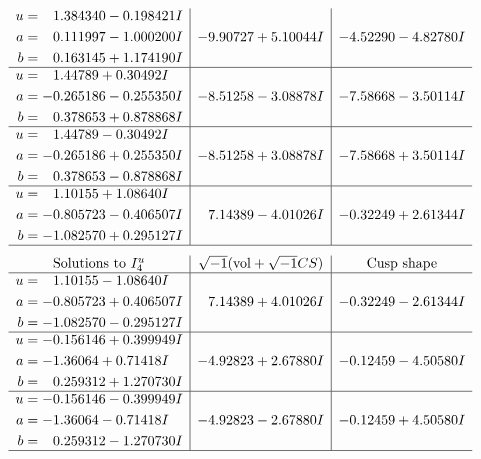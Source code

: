 \documentclass[1p]{elsarticle_modified}
\theoremstyle{definition}
\newcommand{\I}{\sqrt{-1}}
\begin{document}
$$\begin{array}{c|c|c}
\begin{aligned}
u &= \phantom{-}1.384340 - 0.198421 I \\
a &= \phantom{-}0.111997 - 1.000200 I \\
b &= \phantom{-}0.163145 + 1.174190 I\end{aligned}
 & -9.90727 + 5.10044 I & -4.52290 - 4.82780 I \\ \hline\begin{aligned}
u &= \phantom{-}1.44789 + 0.30492 I \\
a &= -0.265186 - 0.255350 I \\
b &= \phantom{-}0.378653 + 0.878868 I\end{aligned}
 & -8.51258 - 3.08878 I & -7.58668 - 3.50114 I \\ \hline\begin{aligned}
u &= \phantom{-}1.44789 - 0.30492 I \\
a &= -0.265186 + 0.255350 I \\
b &= \phantom{-}0.378653 - 0.878868 I\end{aligned}
 & -8.51258 + 3.08878 I & -7.58668 + 3.50114 I \\ \hline\begin{aligned}
u &= \phantom{-}1.10155 + 1.08640 I \\
a &= -0.805723 - 0.406507 I \\
b &= -1.082570 + 0.295127 I\end{aligned}
 & \phantom{-}7.14389 - 4.01026 I & -0.32249 + 2.61344 I\\
 \hline 
 \end{array}$$\newpage$$\begin{array}{c|c|c}  
\text{Solutions to }I^u_{4}& \I (\text{vol} + \sqrt{-1}CS) & \text{Cusp shape}\\
 \hline 
\begin{aligned}
u &= \phantom{-}1.10155 - 1.08640 I \\
a &= -0.805723 + 0.406507 I \\
b &= -1.082570 - 0.295127 I\end{aligned}
 & \phantom{-}7.14389 + 4.01026 I & -0.32249 - 2.61344 I \\ \hline\begin{aligned}
u &= -0.156146 + 0.399949 I \\
a &= -1.36064 + 0.71418 I \\
b &= \phantom{-}0.259312 + 1.270730 I\end{aligned}
 & -4.92823 + 2.67880 I & -0.12459 - 4.50580 I \\ \hline\begin{aligned}
u &= -0.156146 - 0.399949 I \\
a &= -1.36064 - 0.71418 I \\
b &= \phantom{-}0.259312 - 1.270730 I\end{aligned}
 & -4.92823 - 2.67880 I & -0.12459 + 4.50580 I\\
 \hline 
 \end{array}$$\newpage\newpage\renewcommand{\arraystretch}{1}
\end{document}
